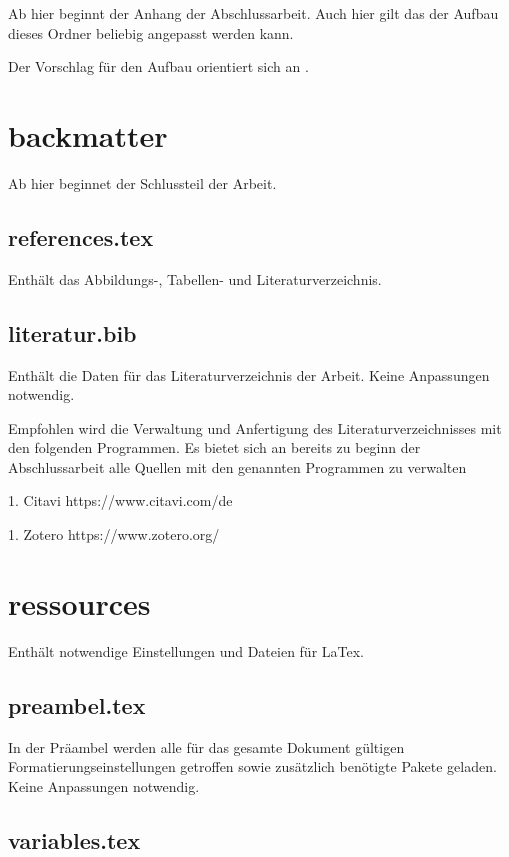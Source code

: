 Ab hier beginnt der Anhang der Abschlussarbeit. Auch hier gilt das der Aufbau dieses Ordner beliebig angepasst werden kann.

Der Vorschlag für den Aufbau orientiert sich an .

\section*{backmatter}

Ab hier beginnet der Schlussteil der Arbeit.

\subsection*{references.tex}

Enthält das Abbildungs-, Tabellen- und Literaturverzeichnis. 

\subsection*{literatur.bib}

Enthält die Daten für das Literaturverzeichnis der Arbeit. Keine Anpassungen notwendig.

Empfohlen wird die Verwaltung und Anfertigung des Literaturverzeichnisses mit den folgenden Programmen. Es bietet sich an bereits zu beginn der Abschlussarbeit alle Quellen mit den genannten Programmen zu verwalten

1. Citavi https://www.citavi.com/de

1. Zotero https://www.zotero.org/

\newpage

\section*{ressources}

Enthält notwendige Einstellungen und Dateien für LaTex.

\subsection*{preambel.tex}

In der Präambel werden alle für das gesamte Dokument gültigen Formatierungseinstellungen getroffen sowie zusätzlich benötigte Pakete geladen. Keine Anpassungen notwendig.

\subsection*{variables.tex}
\label{section:_E_ressources_variables}

